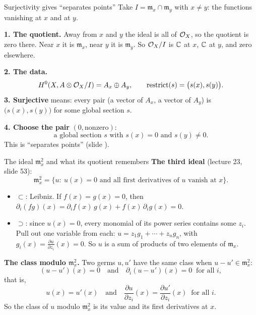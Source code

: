 \begin{frame}{Surjectivity gives ``separates points''}
\label{fr:surj-points}
Take \(I=\mathfrak m_x\cap\mathfrak m_y\) with \(x\ne y\): the functions vanishing at \(x\) and at \(y\).
\par\medskip
\textbf{1. The quotient.} Away from \(x\) and \(y\) the ideal is all of \(\mathcal O_X\), so the quotient is zero there. Near \(x\) it is \(\mathfrak m_x\), near \(y\) it is \(\mathfrak m_y\). So \(\mathcal O_X/I\) is \(\mathbb C\) at \(x\), \(\mathbb C\) at \(y\), and zero elsewhere.
\par\medskip
\textbf{2. The data.}
\[
H^0(X,A\otimes\mathcal O_X/I)=A_x\oplus A_y,\qquad\text{restrict}(s)=\bigl(s(x),s(y)\bigr).
\]
\textbf{3. Surjective} means: every pair (a vector of \(A_x\), a vector of \(A_y\)) is \(\bigl(s(x),s(y)\bigr)\) for some global section \(s\).
\par\medskip
\textbf{4. Choose the pair} \((0,\text{nonzero})\):
\[
\boxed{\text{a global section } s \text{ with } s(x)=0 \text{ and } s(y)\ne0.}
\]
This is ``separates points'' (slide \hyperlink{fr:prov-injective}{\pageref{fr:prov-injective}}).
\end{frame}

\begin{frame}{The ideal \(\mathfrak m_x^2\) and what its quotient remembers}
\label{fr:m2}
\textbf{The third ideal} (lecture 23, slide 53):
\[
\boxed{\mathfrak m_x^2=\{u:\ u(x)=0\text{ and all first derivatives of }u\text{ vanish at }x\}.}
\]
\begin{itemize}
\item \(\subset\): Leibniz. If \(f(x)=g(x)=0\), then \(\partial_i(fg)(x)=\partial_if(x)\,g(x)+f(x)\,\partial_ig(x)=0\).
\item \(\supset\): since \(u(x)=0\), every monomial of its power series contains some \(z_i\). Pull out one variable from each: \(u=z_1g_1+\cdots+z_ng_n\), with \(g_i(x)=\frac{\partial u}{\partial z_i}(x)=0\). So \(u\) is a sum of products of two elements of \(\mathfrak m_x\).
\end{itemize}
\textbf{The class modulo \(\mathfrak m_x^2\).} Two germs \(u,u'\) have the same class when \(u-u'\in\mathfrak m_x^2\):
\[
(u-u')(x)=0\quad\text{and}\quad\partial_i(u-u')(x)=0\ \text{ for all } i,
\]
that is,
\[
u(x)=u'(x)\quad\text{and}\quad\frac{\partial u}{\partial z_i}(x)=\frac{\partial u'}{\partial z_i}(x)\ \text{ for all } i.
\]
So the class of \(u\) modulo \(\mathfrak m_x^2\) is its value and its first derivatives at \(x\).
\end{frame}

